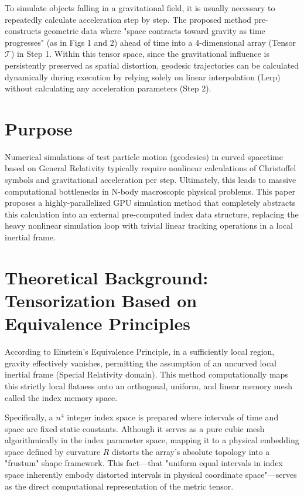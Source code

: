 \documentclass[11pt]{article}
\begin{document}
To simulate objects falling in a gravitational field, it is usually necessary to repeatedly calculate acceleration step by step. The proposed method pre-constructs geometric data where "space contracts toward gravity as time progresses" (as in Figs 1 and 2) ahead of time into a 4-dimensional array (Tensor $\mathcal{T}$) in Step 1. Within this tensor space, since the gravitational influence is persistently preserved as spatial distortion, geodesic trajectories can be calculated dynamically during execution by relying solely on linear interpolation (Lerp) without calculating any acceleration parameters (Step 2).

\section{Purpose}
Numerical simulations of test particle motion (geodesics) in curved spacetime based on General Relativity typically require nonlinear calculations of Christoffel symbols and gravitational acceleration per step. Ultimately, this leads to massive computational bottlenecks in N-body macroscopic physical problems. This paper proposes a highly-parallelized GPU simulation method that completely abstracts this calculation into an external pre-computed index data structure, replacing the heavy nonlinear simulation loop with trivial linear tracking operations in a local inertial frame.

\section{Theoretical Background: Tensorization Based on Equivalence Principles}
According to Einstein's Equivalence Principle, in a sufficiently local region, gravity effectively vanishes, permitting the assumption of an uncurved local inertial frame (Special Relativity domain). This method computationally maps this strictly local flatness onto an orthogonal, uniform, and linear memory mesh called the index memory space.

Specifically, a $n^4$ integer index space is prepared where intervals of time and space are fixed static constants. Although it serves as a pure cubic mesh algorithmically in the index parameter space, mapping it to a physical embedding space defined by curvature $R$ distorts the array's absolute topology into a "frustum" shape framework. This fact—that "uniform equal intervals in index space inherently embody distorted intervals in physical coordinate space"—serves as the direct computational representation of the metric tensor.
\end{document}

